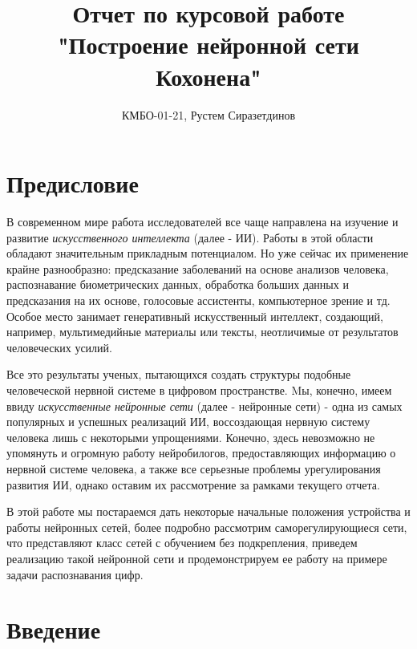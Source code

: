 \documentclass[a4paper,12pt]{report}
\title{Отчет по курсовой работе\\"Построение нейронной сети Кохонена"}
\author{КМБО-01-21, Рустем Сиразетдинов}
\begin{document}
    \maketitle
    \newpage
    \tableofcontents
    \pagebreak

\chapter{Предисловие}
В современном мире работа исследователей все чаще направлена на
изучение и развитие \textit{искусственного интеллекта} (далее -
ИИ). Работы в этой области обладают значительным
прикладным потенциалом. Но уже сейчас их применение
крайне разнообразно: предсказание заболеваний на основе анализов человека,
распознавание биометрических данных, обработка больших данных и предсказания на их основе, голосовые
ассистенты, компьютерное зрение и тд.
Особое место занимает генеративный искусственный интеллект,
создающий, например, мультимедийные материалы или тексты,
неотличимые от результатов человеческих усилий.

Все это результаты ученых, пытающихся создать структуры подобные человеческой нервной
системе в цифровом пространстве. Mы, конечно, имеем ввиду
\textit{искусственные нейронные сети} (далее - нейронные сети) - одна из самых
популярных и успешных реализаций ИИ, воссоздающая нервную систему
человека лишь с некоторыми упрощениями. Конечно, здесь невозможно не
упомянуть и огромную работу нейробилогов, предоставляющих
информацию о нервной системе человека, а также все серьезные проблемы
урегулирования развития ИИ, однако оставим их рассмотрение за рамками текущего отчета.

В этой работе мы постараемся дать некоторые начальные положения
устройства и работы нейронных сетей, более подробно рассмотрим саморегулирующиеся сети, что представляют класс
сетей с обучением без подкрепления, приведем реализацию такой
нейронной сети и продемонстрируем ее работу на примере задачи
распознавания цифр.

\chapter{Введение} \label{chapter:Introduction}
\end{document}
